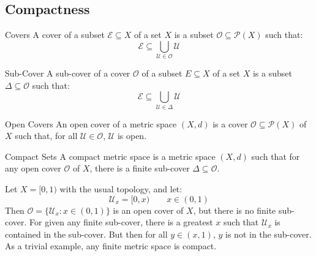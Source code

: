 \documentclass[crop=false,class=book,oneside]{standalone}
\begin{document}
        \subsection{Compactness}
            \begin{ldefinition}{Covers}
                A cover of a subset $\mathcal{E}\subseteq{X}$ of
                a set $X$ is a subset
                $\mathcal{O}\subseteq\mathcal{P}(X)$ such that:
                \begin{equation}
                    \mathcal{E}\subseteq
                    \bigcup_{\mathcal{U}\in\mathcal{O}}
                        \mathcal{U}
                \end{equation}
            \end{ldefinition}
            \begin{ldefinition}{Sub-Cover}
                A sub-cover of a cover $\mathcal{O}$ of a subset
                $E\subseteq{X}$ of a set $X$ is a subset
                $\Delta\subseteq\mathcal{O}$ such that:
              \begin{equation}
                    \mathcal{E}\subseteq
                    \bigcup_{\mathcal{U}\in\Delta}
                        \mathcal{U}
                \end{equation}
            \end{ldefinition}
            \begin{ldefinition}{Open Covers}
                An open cover of a metric space $(X,d)$ is a cover
                $\mathcal{O}\subseteq\mathcal{P}(X)$ of $X$ such
                that, for all $\mathcal{U}\in\mathcal{O}$,
                $\mathcal{U}$ is open.
            \end{ldefinition}
            \begin{ldefinition}{Compact Sets}
                A compact metric space is a metric space $(X,d)$
                such that for any open cover $\mathcal{O}$ of
                $X$, there is a finite
                sub-cover $\Delta\subseteq\mathcal{O}$.
            \end{ldefinition}
            \begin{lexample}
                Let $X=[0,1)$ with the usual topology, and let:
                \begin{equation}
                    \mathcal{U}_{x}=[0,x)
                    \quad\quad
                    x\in(0,1)
                \end{equation}
                Then $\mathcal{O}=\{\mathcal{U}_{x}:x\in(0,1)\}$
                is an open cover of $X$, but there is no finite
                sub-cover. For given any finite sub-cover,
                there is a greatest $x$ such that
                $\mathcal{U}_{x}$ is contained in the sub-cover.
                But then for all $y\in(x,1)$, $y$ is not in
                the sub-cover. As a trivial example, any
                finite metric space is compact.
            \end{lexample}
\end{document}
